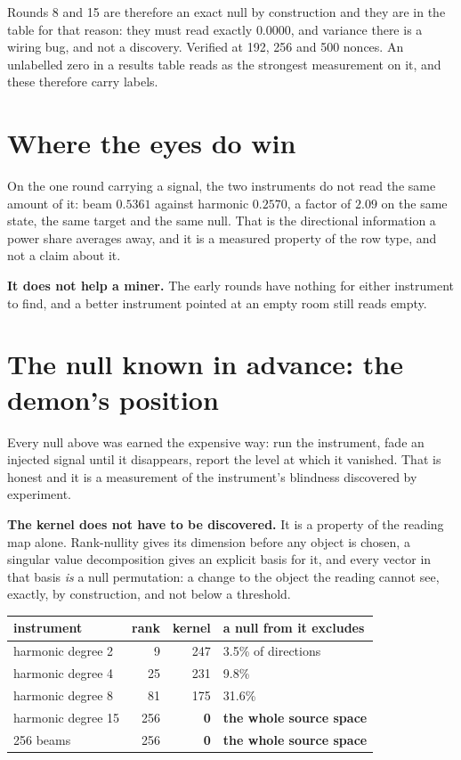 Rounds 8 and 15 are therefore an exact null by construction and they are in the table for that
reason: they must read exactly \(0.0000\), and variance there is a wiring bug, and not a
discovery. Verified at 192, 256 and 500 nonces. An unlabelled zero in a results table reads as the
strongest measurement on it, and these therefore carry labels.

\section{Where the eyes do win}

On the one round carrying a signal, the two instruments do not read the same amount of it: beam
\(0.5361\) against harmonic \(0.2570\), a factor of \(\mathbf{2.09}\) on the same state, the same
target and the same null. That is the directional information a power share averages away, and it is
a measured property of the row type, and not a claim about it.

\textbf{It does not help a miner.} The early rounds have nothing for either instrument to find, and a
better instrument pointed at an empty room still reads empty.

\section{The null known in advance: the demon's position}

Every null above was earned the expensive way: run the instrument, fade an injected signal until it
disappears, report the level at which it vanished. That is honest and it is a measurement of the
instrument's blindness discovered by experiment.

\textbf{The kernel does not have to be discovered.} It is a property of the reading map
alone. Rank-nullity gives its dimension before any object is chosen, a singular value decomposition
gives an explicit basis for it, and every vector in that basis \emph{is} a null permutation: a
change to the object the reading cannot see, exactly, by construction, and not below a threshold.

\begin{center}
\begin{tabular}{lrrl}
\toprule
instrument & rank & kernel & a null from it excludes \\
\midrule
harmonic degree 2 & 9 & 247 & 3.5\% of directions \\
harmonic degree 4 & 25 & 231 & 9.8\% \\
harmonic degree 8 & 81 & 175 & 31.6\% \\
harmonic degree 15 & 256 & \textbf{0} & \textbf{the whole source space} \\
256 beams & 256 & \textbf{0} & \textbf{the whole source space} \\
\bottomrule
\end{tabular}
\end{center}

